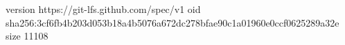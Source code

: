 version https://git-lfs.github.com/spec/v1
oid sha256:3cf6fb4b203d053b18a4b5076a672dc278bfae90c1a01960e0ccf0625289a32e
size 11108
